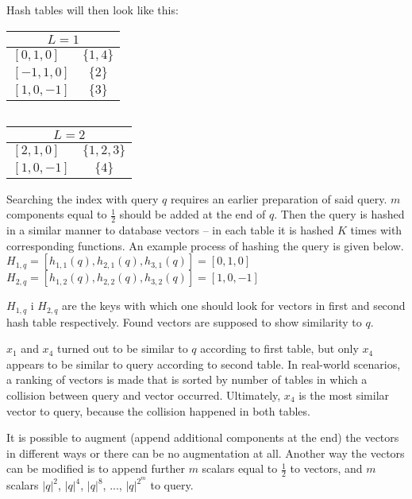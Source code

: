 Hash tables will then look like this:
\renewcommand{\arraystretch}{1.2}
\begin{center}
\begin{tabular}{|l|c|}
\hline
\multicolumn{2}{|c|}{$L = 1$} \\
\hline
$[0, 1, 0]$ & $\{1, 4\}$ \\
\hline
$[-1, 1, 0]$ & $\{2\}$ \\
\hline
$[1, 0, -1]$ & $\{3\}$ \\
\hline
\end{tabular}
$\ \ \ \ $
\begin{tabular}{|l|c|}
\hline
\multicolumn{2}{|c|}{$L = 2$} \\
\hline
$[2, 1, 0]$ & $\{1, 2, 3\}$ \\
\hline
$[1, 0, -1]$ & $\{4\}$ \\
\hline
\end{tabular}
\end{center}
Searching the index with query $q$ requires an earlier preparation of said query.
$m$ components equal to $\frac{1}{2}$ should be added at the end of $q$.
Then the query is hashed in a similar manner to database vectors -- in each table it is hashed $K$ times with corresponding functions.
An example process of hashing the query is given below.\\
$H_{1,q} = [h_{1,1}(q), h_{2,1}(q), h_{3,1}(q)] = [0, 1, 0]$\\
$H_{2,q} = [h_{1,2}(q), h_{2,2}(q), h_{3,2}(q)] = [1, 0, -1]$

$H_{1,q}$ i $H_{2,q}$ are the keys with which one should look for vectors in first and second hash table respectively.
Found vectors are supposed to show similarity to $q$.
\par
$x_1$ and $x_4$ turned out to be similar to $q$ according to first table, but only $x_4$ appears to be similar to query according to second table.
In real-world scenarios, a ranking of vectors is made that is sorted by number of tables in which a collision between query and vector occurred.
Ultimately, $x_4$ is the most similar vector to query, because the collision happened in both tables.
\par
It is possible to augment (append additional components at the end) the vectors in different ways or there can be no augmentation at all.
Another way the vectors can be modified is to append further $m$ scalars equal to $\frac{1}{2}$ to vectors, and $m$ scalars $|q|^2$, $|q|^4$, $|q|^8$, $...$, $|q|^{2^m}$ to query.
